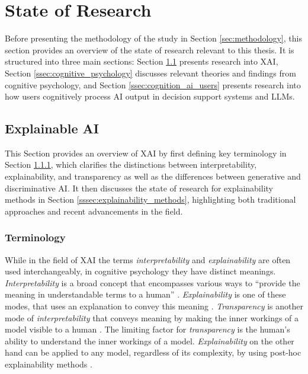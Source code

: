 \section{State of Research} \label{sec:state_of_research}

Before presenting the methodology of the study in Section \ref{sec:methodology}, this section provides an overview of the state of research relevant to this thesis. It is structured into three main sections: Section \ref{ssec:xai} presents research into \ac{XAI}, Section \ref{ssec:cognitive_psychology} discusses relevant theories and findings from cognitive psychology, and Section \ref{ssec:cognition_ai_users} presents research into how users cognitively process \ac{AI} output in decision support systems and \acp{LLM}.

\subsection{Explainable AI} \label{ssec:xai}

This Section provides an overview of \ac{XAI} by first defining key terminology in Section \ref{sssec:terminology}, which clarifies the distinctions between interpretability, explainability, and transparency as well as the differences between generative and discriminative \ac{AI}. It then discusses the state of research for explainability methods in Section \ref{sssec:explainability_methods}, highlighting both traditional approaches and recent advancements in the field.

\subsubsection{Terminology} \label{sssec:terminology}

While in the field of \ac{XAI} the terms \textit{interpretability} and \textit{explainability} are often used interchangeably, in cognitive psychology they have distinct meanings. \textit{Interpretability} is a broad concept that encompasses various ways to “provide the meaning in understandable terms to a human” \parencite{Arrieta2020}. \textit{Explainability} is one of these modes, that uses an explanation to convey this meaning \parencite{Lipton2016}. \textit{Transparency} is another mode of \textit{interpretability} that conveys meaning by making the inner workings of a model visible to a human \parencite{Arrieta2020}. The limiting factor for \textit{transparency} is the human's ability to understand the inner workings of a model. \textit{Explainability} on the other hand can be applied to any model, regardless of its complexity, by using post-hoc explainability methods \parencite{Arrieta2020}.

